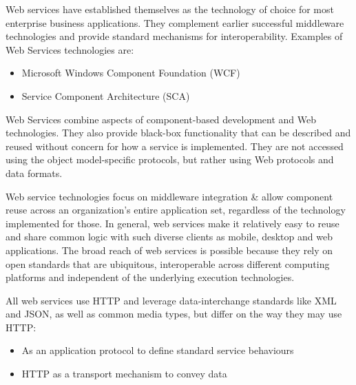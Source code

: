     Web services have established themselves as the technology of choice for most enterprise business
    applications. They complement earlier successful middleware technologies and provide standard mechanisms
    for interoperability. Examples of Web Services technologies are:
    \begin{itemize}
        \item Microsoft Windows Component Foundation (WCF)
        \item Service Component Architecture (SCA)
    \end{itemize}

    Web Services combine aspects of component-based development and Web technologies. They also provide black-box
    functionality that can be described and reused without concern for how a service is implemented. They are not
    accessed using the object model-specific protocols, but rather using Web protocols and data formats.

    Web service technologies focus on middleware integration & allow component reuse across an organization's
    entire application set, regardless of the technology implemented for those. In general, web services make it
    relatively easy to reuse and share common logic with such diverse clients as mobile, desktop and web
    applications. The broad reach of web services is possible because they rely on open standards that are
    ubiquitous, interoperable across different computing platforms and independent of the underlying execution
    technologies.

    All web services use HTTP and leverage data-interchange standards like XML and JSON, as well as common media
    types, but differ on the way they may use HTTP:
    \begin{itemize}
        \item As an application protocol to define standard service behaviours
        \item HTTP as a transport mechanism to convey data
    \end{itemize}

